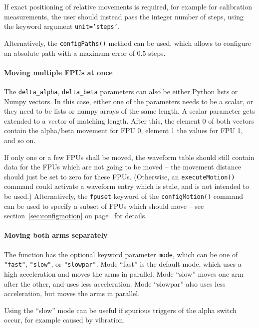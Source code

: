 \documentclass[fontsize=12,a4paper]{scrreprt}
\begin{document}
If exact positioning of relative movements is required, for example
for calibration measurements, the user should instead pass the integer
number of steps, using the keyword argument \texttt{unit='steps'}.

Alternatively, the \texttt{configPaths()} method can be used, which
allows to configure an absolute path with a maximum error of 0.5
steps.

\paragraph{Moving multiple FPUs at once}
 The
\verb+delta_alpha+, \verb+delta_beta+ parameters can also be either
Python lists or Numpy vectors. In this case, either one of the
parameters needs to be a scalar, or they need to be lists or numpy
arrays of the same length. A scalar parameter gets extended to a
vector of matching length. After this, the element 0 of both vectors
contain the alpha/beta movement for FPU 0, element 1 the values for
FPU 1, and so on.

If only one or a few FPUs shall be moved, the waveform table should
still contain data for the FPUs which are not going to be moved -- the
movement distance should just be set to zero for these FPUs.
(Otherwise, an \texttt{executeMotion()} command could activate a
waveform entry which is stale, and is not intended to be used.)
Alternatively, the \texttt{fpuset} keyword of the
\texttt{configMotion()} command can be used to specify a subset of FPUs
which should move -- see section~\ref{sec:configmotion} on
page~\pageref{sec:configmotion} for details.

\paragraph{Moving both arms separately}

The function has the optional keyword parameter \texttt{mode}, which
can be one of \texttt{"fast"}, \texttt{"slow"}, or \texttt{"slowpar"}.
Mode ``fast'' is the default mode, which uses a high acceleration and
moves the arms in parallel. Mode ``slow'' moves one arm after the
other, and uses less acceleration. Mode ``slowpar'' also uses less
acceleration, but moves the arms in parallel.

Using the ``slow'' mode can be useful if spurious triggers of the
alpha switch occur, for example caused by vibration.
\end{document}
